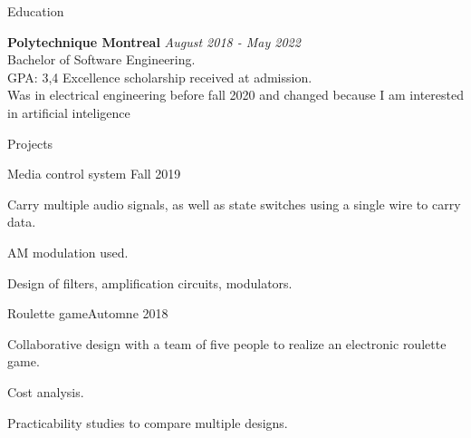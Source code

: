 \documentclass{resume} %
\begin{document}
	
	
	\begin{rSection}{Education}
		
		{\bf Polytechnique Montreal} \hfill {\em August 2018 - May 2022} 
		\\ Bachelor of Software Engineering.
		\\GPA: 3,4 \hspace{0.5cm}  Excellence scholarship received at admission.
		\\Was in electrical engineering before fall 2020 and changed because I am interested in artificial inteligence
	\end{rSection}
	
	\begin{rSection}{Projects}
		
		\begin{rSubsection}{Media control system }{Fall 2019}{}{}
			\item   Carry multiple audio signals, as well as state switches using a single wire to carry data.
			\item   AM modulation used.
			\item   Design of filters, amplification circuits, modulators.
			
		\end{rSubsection}
		
%			
		
		\begin{rSubsection}{Roulette game}{Automne 2018}{}{}
			\item  Collaborative design with a team of five people to realize an electronic roulette game.
			\item  Cost analysis.
			\item  Practicability studies to compare multiple designs.
		\end{rSubsection} 
		
	\end{rSection}
	
\end{document}
